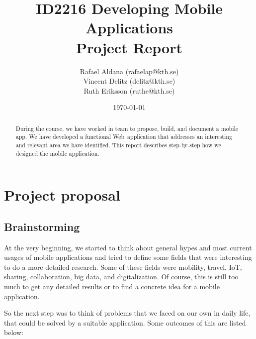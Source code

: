 \documentclass[11pt,twoside,a4paper]{report}
\newcommand{\webOrNative}{Web~}
\begin{document}
\title{ID2216 Developing Mobile Applications\\Project Report}
\author{Rafael Aldana (rafaelap@kth.se)\\Vincent Delitz (delitz@kth.se)\\Ruth Eriksson (ruthe@kth.se)}
\date{\today}
\maketitle

\newpage

\begin{abstract}
During the course, we have worked in team to propose, build, and document a mobile app. We have developed a functional \webOrNative application that addresses an interesting and relevant area we have identified. This report describes step-by-step how we designed the mobile application.
\end{abstract}

\tableofcontents



\newpage

\chapter{Project proposal}

\section{Brainstorming}

At the very beginning, we started to think about general hypes and most current usages of mobile applications and tried to define some fields that were interesting to do a more detailed research. Some of these fields were mobility, travel, IoT, sharing, collaboration, big data, and digitalization. Of course, this is still too much to get any detailed results or to find a concrete idea for a mobile application.

So the next step was to think of problems that we faced on our own in daily life, that could be solved by a suitable application. Some outcomes of this are listed below:
\end{document}
